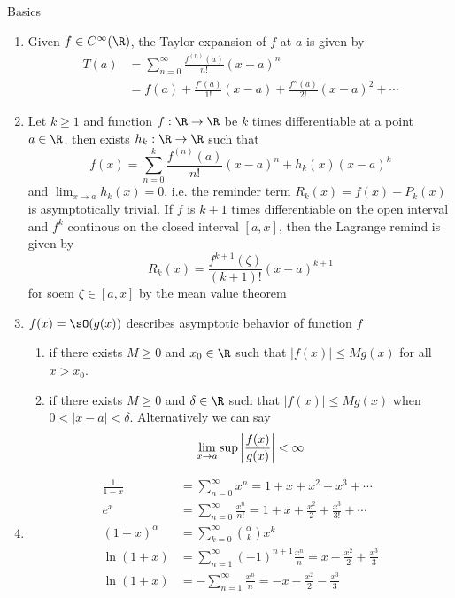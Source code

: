 \documentclass[11pt]{article}
\begin{document}
\tableofcontents

\newpage
\begin{center}
    Basics
\end{center}

\begin{enumerate}
    \item {} Given $f \in C^{\infty}(\R)$, the Taylor expansion of $f$ at $a$ is given by 
    \begin{align*}
        T(a)
        &= \sum_{n=0}^{\infty} \frac{f^{(n)}(a)}{n!} (x-a)^n \\
        &= f(a) + \frac{f'(a)}{1!}(x-a) + \frac{f''(a)}{2!} (x-a)^2 + \cdots
    \end{align*}
    \item {} Let $k\geq 1$ and function $f:\R\to\R$ be $k$ times differentiable at a point $a\in \R$, then exists $h_k:\R\to\R$ such that 
    \[
        f(x)
        = \sum_{n=0}^{k} \frac{f^{(n)}(a)}{n!} (x-a)^n + h_k(x) (x-a)^k
    \]
    and $\lim_{x\to a} h_k(x) = 0$, i.e. the reminder term $R_k(x) = f(x) - P_k(x)$ is asymptotically trivial. If $f$ is $k+1$ times differentiable on the open interval and $f^k$ continous on the closed interval $[a,x]$, then the Lagrange remind is given by 
    \[
        R_k(x) = \frac{f^{k+1}(\zeta)}{(k+1)!} (x-a)^{k+1}
    \]
    for soem $\zeta \in [a,x]$ by the mean value theorem
    \item {} $f(x) = \sO(g(x))$   describes asymptotic behavior of function $f$
    \begin{enumerate}
        \item {} if there exists $M\geq 0$ and $x_0\in\R$ such that $|f(x)| \leq M g(x)$ for all $x>x_0$. 
        \item {} if there exists $M\geq 0$ and $\delta \in\R$ such that $|f(x)| \leq M g(x)$ when $0 < |x-a| < \delta$. Alternatively we can say 
        \[
            \lim_{x\to a} \sup \left|\frac{f(x)}{g(x)}\right| < \infty
        \]
    \end{enumerate}
    \item {}
    \begin{align*}
        \frac{1}{1-x} 
            &= \sum_{n=0}^{\infty} x^n = 1+x+x^2+x^3+\cdots \\
        e^x 
            &= \sum_{n=0}^{\infty} \frac{x^n}{n!} = 1+x+\frac{x^2}{2}+\frac{x^3}{3!}+\cdots \\
        (1+x)^{\alpha}
            &= \sum_{k=0}^{\infty} \binom{\alpha}{k} x^k \\
        \ln(1+x)
            &= \sum_{n=1}^{\infty} (-1)^{n+1} \frac{x^n}{n} = x - \frac{x^2}{2} + \frac{x^3}{3} \tag{convergent if $|x|<1$} \\
        \ln(1+x)
            &= -\sum_{n=1}^{\infty} \frac{x^n}{n} = - x - \frac{x^2}{2} - \frac{x^3}{3} \tag{convergent if $|x|<1$}
    \end{align*}
\end{enumerate}
\end{document}
